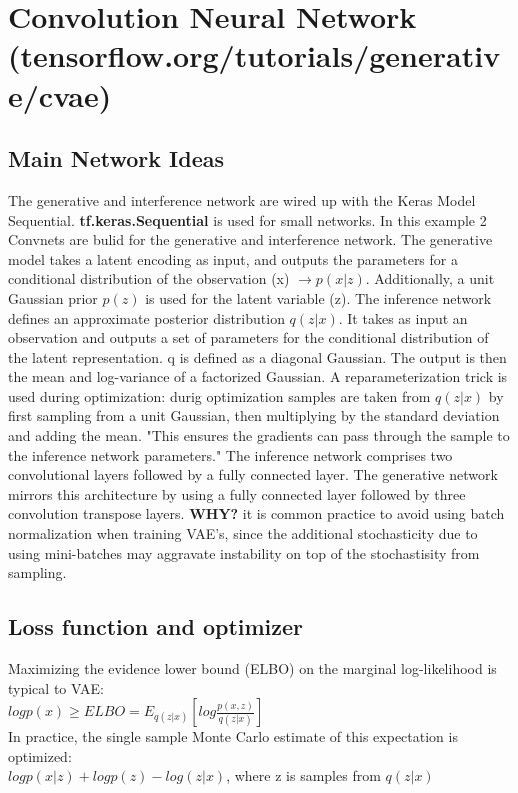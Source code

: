 \documentclass[12pt, a4paper]{article}
\begin{document}
	\section{Convolution Neural Network \\ 
			(tensorflow.org/tutorials/generative/cvae)}
		\subsection{Main Network Ideas}
	The generative and interference network are wired up with the Keras Model Sequential. \textbf{tf.keras.Sequential} is used for small networks. In this example 2 Convnets are bulid for the generative and interference network. The generative model takes a latent encoding as input, and outputs the parameters for a conditional distribution of the observation (x) $\rightarrow p(x|z)$. Additionally, a unit Gaussian prior $p(z)$ is used for the latent variable (z). The inference network defines an approximate posterior distribution $q(z|x)$. It takes as input an observation and outputs a set of parameters for the conditional distribution of the latent representation. q is defined as a diagonal Gaussian. The output is then the mean and log-variance of a factorized Gaussian. A reparameterization trick is used during optimization: durig optimization samples are taken from $q(z|x)$ by first sampling from a unit Gaussian, then multiplying by the standard deviation and adding the mean. "This ensures the gradients can pass through the sample to the inference network parameters."
	The inference network comprises two convolutional layers followed by a fully connected layer. The generative network mirrors this architecture by using a fully connected layer followed by three convolution transpose layers. \textbf{WHY?} it is common practice to avoid using batch normalization when training VAE's, since the additional stochasticity due to using mini-batches may aggravate instability on top of the stochastisity from sampling.
	\subsection{Loss function and optimizer}
	Maximizing the evidence lower bound (ELBO) on the marginal log-likelihood is typical to VAE:\\
	 $logp(x)\geq ELBO = E_{q(z|x)} \left[log\frac{p(x,z)}{q(z|x)}\right]$\\
	In practice, the single sample Monte Carlo estimate of this expectation is optimized:\\
	 $logp(x|z)+logp(z)-log(z|x)$, where z is samples from $q(z|x)$
\end{document}
